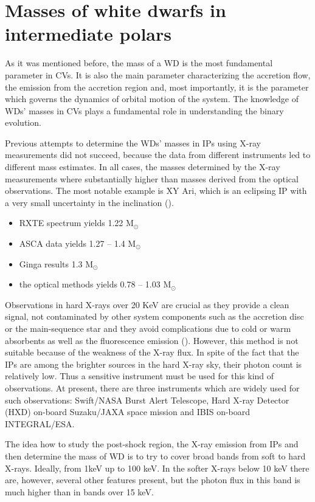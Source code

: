 \documentclass[oneside,a4paper,11pt]{report}
\begin{document}
\chapter{Masses of white dwarfs in intermediate polars}
As it was mentioned before, the mass of a WD is the most fundamental parameter in CVs. It is also the 
main parameter characterizing the accretion flow, the emission from the accretion region and, most 
importantly, it is the parameter which governs the dynamics of orbital motion of the system. The 
knowledge of WDs' masses in CVs plays a fundamental role in understanding the binary evolution. 

Previous attempts to determine the WDs' masses in IPs using X-ray measurements did not succeed, 
because the data from different instruments led to different mass estimates. In all cases, the 
masses  determined by the X-ray measurements where substantially higher than masses derived from  the optical 
observations. The most notable example is XY Ari, which is an eclipsing IP with a very small uncertainty in 
the inclination (\citet{1998MNRAS.297.1269R}).          
\begin{itemize}
 \item RXTE spectrum yields 1.22 M$_\odot$
 \item ASCA data yields 1.27 -- 1.4 M$_\odot$
 \item Ginga results 1.3 M$_\odot$
 \item the optical methods yields 0.78 -- 1.03 M$_\odot$ 
\end{itemize}
Observations in hard X-rays over 20 KeV are crucial as they provide a clean signal, not contaminated 
by other system components such as the accretion disc or the main-sequence star and they avoid 
complications due to cold or warm absorbents as well as the fluorescence emission (\citet{2009A&A...496..121B}). 
However, this method is not suitable because of the weakness of the X-ray flux. In spite of the fact that the IPs 
are among the brighter sources in the hard X-ray sky, their photon count is relatively low. Thus a sensitive 
instrument must be used for this kind of observations. At present, there are three instruments which are 
widely used for such observations: Swift/NASA Burst Alert Telescope, Hard X-ray Detector
(HXD) on-board Suzaku/JAXA space mission and IBIS on-board INTEGRAL/ESA.

The idea how to study the post-shock region, the X-ray emission from IPs and then 
determine the mass of WD is to try to cover broad bands from soft to hard X-rays. Ideally, 
from 1keV up to 100 keV. In the softer X-rays below 10 keV there are, however, several other features 
present, but the photon flux in this band is much higher than in bands over 15 keV. 
\end{document}
